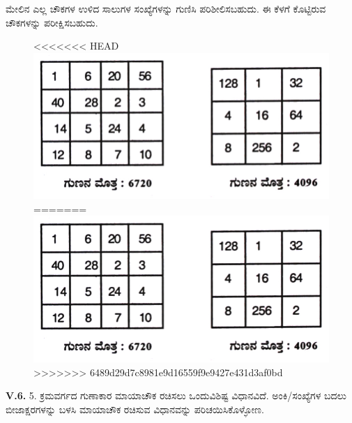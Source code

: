 ಮೇಲಿನ ಎಲ್ಲ ಚೌಕಗಳ ಉಳಿದ ಸಾಲುಗಳ ಸಂಖ್ಯೆಗಳನ್ನು ಗುಣಿಸಿ ಪರಿಶೀಲಿಸಬಹುದು. ಈ ಕೆಳಗೆ ಕೊಟ್ಟಿರುವ ಚೌಕಗಳನ್ನು ಪರೀಕ್ಷಿಸಬಹುದು.
\begin{figure}[H]
<<<<<<< HEAD
\includegraphics{src/figures/chap7/fig7-27.jpg}
=======
\includegraphics[scale=0.8]{src/figures/chap7/fig7.27.jpg}
>>>>>>> 6489d29d7c8981e9d16559f9e9427e431d3af0bd
\end{figure}

\textbf{V.6.} 5. ಕ್ರಮವರ್ಗದ ಗುಣಾಕಾರ ಮಾಯಾಚೌಕ ರಚಿಸಲು ಒಂದುವಿಶಿಷ್ಟ ವಿಧಾನ\-ವಿದೆ. ಅಂಕಿ/ಸಂಖ್ಯೆಗಳ ಬದಲು ಬೀಜಾಕ್ಷರಗಳನ್ನು ಬಳಸಿ ಮಾಯಾಚೌಕ ರಚಿಸುವ ವಿಧಾನ\-ವನ್ನು ಪರಿಚಯಿಸಿಕೊಳ್ಳೋಣ.

